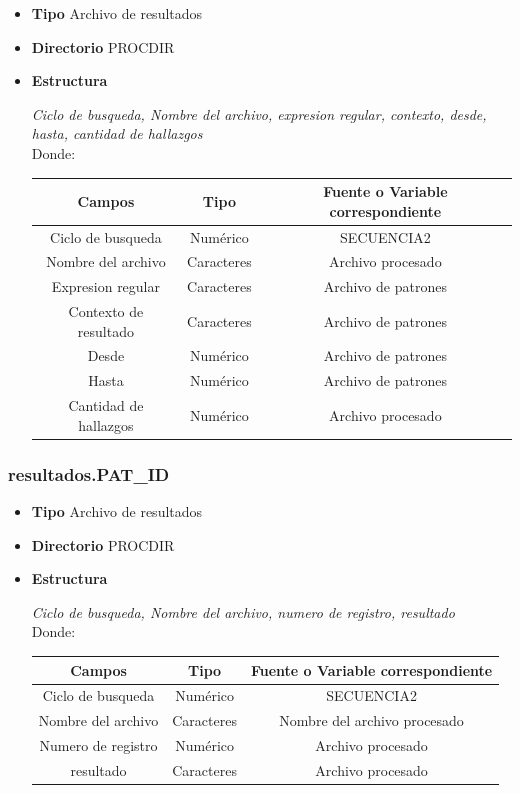 \documentclass[a4paper,10pt,titlepage]{article}
\begin{document}
			\begin {itemize}
				\item \textbf{Tipo} {Archivo de resultados}
				\item \textbf{Directorio} {PROCDIR}
				\item \textbf{Estructura} {\textit{Ciclo de busqueda, Nombre del archivo, expresion regular, contexto, desde, hasta, cantidad de hallazgos}\\
					Donde: \ 
					\begin{table}[H]
					\centering
					\begin{tabular}{| c | c | c |}
						\hline
						Campos 	& Tipo & Fuente o Variable correspondiente \\
						\hline
							Ciclo de busqueda  & Numérico & SECUENCIA2 \\
						\hline
							Nombre del archivo  & Caracteres & Archivo procesado \\
						\hline
							Expresion regular  & Caracteres & Archivo de patrones \\
						\hline
							Contexto de resultado  & Caracteres & Archivo de patrones \\
						\hline
							Desde  & Numérico & Archivo de patrones \\
						\hline
							Hasta  & Numérico & Archivo de patrones \\
						\hline
							Cantidad de hallazgos  & Numérico & Archivo procesado \\
						\hline    
					\end{tabular}
					\end{table}
				}
			\end{itemize}


		\subsubsection{resultados.PAT\_ID}

			\begin {itemize}
				\item \textbf{Tipo} {Archivo de resultados}
				\item \textbf{Directorio} {PROCDIR}
				\item \textbf{Estructura} {\textit{Ciclo de busqueda, Nombre del archivo, numero de registro, resultado}\\
					Donde: \ 
					\begin{table}[H]
					\centering
					\begin{tabular}{| c | c | c |}
						\hline
						Campos 	& Tipo & Fuente o Variable correspondiente \\
						\hline
							Ciclo de busqueda  & Numérico & SECUENCIA2 \\
						\hline
							Nombre del archivo  & Caracteres & Nombre del archivo procesado \\
						\hline
							Numero de registro  & Numérico & Archivo procesado \\
						\hline
							resultado  & Caracteres & Archivo procesado \\
						\hline
					\end{tabular}
					\end{table}
				}
			\end{itemize}
\end{document}
